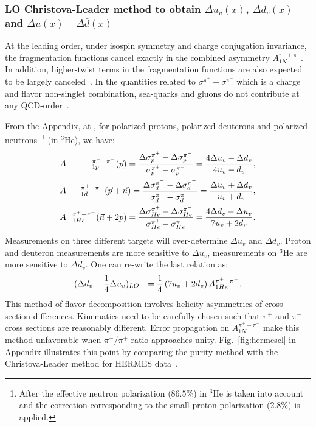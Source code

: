 \subsubsection{LO Christova-Leader method to obtain $\Delta u_v(x)$, $\Delta d_v(x)$ and $\Delta \bar{u}(x) - \Delta \bar{d}(x)$}
At the leading order, 
under isospin symmetry and charge conjugation invariance, the fragmentation functions 
cancel exactly in the combined asymmetry $A_{1N}^{\pi^+ \pm \pi^-}$. In addition, higher-twist 
terms in the fragmentation functions are also expected to be largely canceled~\cite{leader2}.
In the quantities related to $\sigma^{\pi^+} - \sigma^{\pi^-}$ which is a charge and flavor non-singlet
combination, sea-quarks and gluons do
not contribute at any QCD-order~\cite{leader2}.

From the Appendix, at \lo, for polarized 
protons, polarized deuterons and polarized neutrons~\footnote{After the effective neutron polarization ($86.5 \%$) 
in $^3$He is taken into account and the correction corresponding to the small 
proton polarization ($2.8 \%$) is applied.} (in $^3$He), we have:
\begin{eqnarray}
\label{eq:cllo}
&A&\hspace{-0.1cm}_{1p}^{\pi^+ - \pi^-}({\vec p})  =  { \Delta \sigma_p^{\pi^+}-\Delta \sigma_p^{\pi^-} \over
\sigma_p^{\pi^+} - \sigma_p^{\pi^-} }=
{  4\Delta u_v - \Delta d_v 
\over 4u_v - d_v }, \\
&A&\hspace{-0.1cm}_{1d}^{\pi^+ - \pi^-} ({\vec p}+ {\vec n}) =  { \Delta \sigma_d^{\pi^+}-\Delta \sigma_d^{\pi^-} \over
\sigma_d^{\pi^+}- \sigma_d^{\pi^-} }=
{ \Delta u_v + \Delta d_v 
\over u_v + d_v}, \\
&A&\hspace{-0.1cm}_{1He}^{\pi^+ - \pi^-} ({\vec n}+2p) =  { \Delta \sigma_{He}^{\pi^+}-\Delta \sigma_{He}^{\pi^-} \over
\sigma_{He}^{\pi^+}- \sigma_{He}^{\pi^-} }=
{ 4\Delta d_v - \Delta u_v 
\over 7 u_v + 2 d_v}. 
\end{eqnarray}
Measurements on three different targets will over-determine $\Delta u_v$ and $\Delta d_v$.
Proton and deuteron measurements are more sensitive to $\Delta u_v$, measurements on $^3$He  
are more sensitive
to $\Delta d_v$. One can re-write the last relation as:
\begin{eqnarray}
\label{Eq:cl2}
&(\Delta d_v-{1 \over 4} \Delta u_v )_{LO} &  = {1 \over 4} \left( 7 u_v + 2 d_v \right)  A_{1He}^{\pi^+ - \pi^-}.
\end{eqnarray}
This method of flavor decomposition involves helicity asymmetries of cross section differences. 
Kinematics need to be carefully chosen 
such that $\pi^+$ and $\pi^-$ cross sections are reasonably different.  
Error propagation on $A_{1N}^{\pi^+ - \pi^-}$ make this method unfavorable when $\pi^-/\pi^+$ ratio
approaches unity. Fig.~\ref{fig:hermescl}  in Appendix illustrates this point by comparing the purity method with
the Christova-Leader method for HERMES data~\cite{hermesthesis}.

